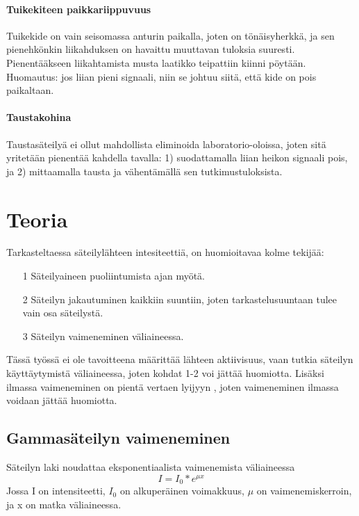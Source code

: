 \documentclass[a4paper, 12pt]{article}
\begin{document}
\paragraph{Tuikekiteen paikkariippuvuus\\}
Tuikekide on vain seisomassa anturin paikalla, joten on tönäisyherkkä, ja sen pienehkönkin liikahduksen on havaittu muuttavan tuloksia suuresti. Pienentääkseen liikahtamista musta laatikko teipattiin kiinni pöytään. Huomautus: jos liian pieni signaali, niin se johtuu siitä, että kide on pois paikaltaan.

\paragraph{Taustakohina\\}
Taustasäteilyä ei ollut mahdollista eliminoida laboratorio-oloissa, joten sitä yritetään pienentää kahdella tavalla: 1) suodattamalla liian heikon signaali pois, ja 2) mittaamalla tausta ja vähentämällä sen tutkimustuloksista.

\section{Teoria}

Tarkasteltaessa säteilylähteen intesiteettiä, on huomioitavaa kolme tekijää:
\begin{enumerate}
\item[1] Säteilyaineen puoliintumista ajan myötä.
\item[2] Säteilyn jakautuminen kaikkiin suuntiin, joten tarkastelusuuntaan tulee vain osa säteilystä.
\item[3] Säteilyn vaimeneminen väliaineessa.
\end{enumerate}

Tässä työssä ei ole tavoitteena määrittää lähteen aktiivisuus, vaan tutkia säteilyn käyttäytymistä väliaineessa, joten kohdat 1-2 voi jättää huomiotta. Lisäksi ilmassa vaimeneminen on pientä vertaen lyijyyn \cite{GammaLead} \cite{GammaAir}, joten vaimeneminen ilmassa voidaan jättää huomiotta.

\subsection{Gammasäteilyn vaimeneminen}

Säteilyn laki noudattaa eksponentiaalista vaimenemista väliaineessa \cite{Vaimeneminen}
\begin{equation}
I = I_0 * e^{\mu x}
\label{eq:SateilynVaimeneminen}
\end{equation}
Jossa I on intensiteetti, $I_0$ on alkuperäinen voimakkuus, $\mu$ on vaimenemiskerroin, ja x on matka väliaineessa.
\end{document}

